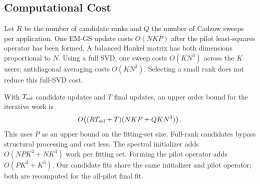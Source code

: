 \documentclass[journal]{IEEEtran}
\begin{document}
\begin{center}
\end{center}

\subsection{Computational Cost}
\label{sec:cost}

Let $R$ be the number of candidate ranks and $Q$ the number of Cadzow
sweeps per application. One EM-GS update costs $O(NKP)$ after the pilot
least-squares operator has been formed. A balanced Hankel matrix has both
dimensions proportional to $N$. Using a full SVD, one sweep costs
$O(KN^3)$ across the $K$ users; antidiagonal averaging costs $O(KN^2)$.
Selecting a small rank does not reduce this full-SVD cost.

With $T_{\rm sel}$ candidate updates and $T$ final updates, an upper
order bound for the iterative work is
\begin{equation}
O\!\left((RT_{\rm sel}+T)(NKP+QKN^3)\right).
\end{equation}
This uses $P$ as an upper bound on the fitting-set size. Full-rank
candidates bypass structural processing and cost less. The spectral
initializer adds $O(NPK^2+NK^3)$ work per fitting set. Forming the pilot
operator adds $O(PK^2+K^3)$. Our candidate fits share the same initializer
and pilot operator; both are recomputed for the all-pilot final fit.
\end{document}
